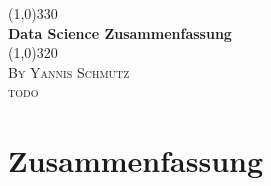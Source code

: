 \documentclass{article}
\begin{document}
\begin{titlepage}
	
	\begin{center}
	\line(1,0){330} \\
	[2mm]
	\huge{\bfseries Data Science Zusammenfassung} \\
	[2mm]
	\line(1,0){320} \\
	[1,5cm]
	\textsc{\LARGE By Yannis Schmutz} \\
	[0.75cm]
	\textsc{\large todo} \\
	
	\end{center}
	
\end{titlepage}

\section*{Zusammenfassung}	%
\cleardoublepage	%

\renewcommand{\contentsname}{Inhaltsverzeichnis}	%
\tableofcontents		%
\thispagestyle{empty}	%
\cleardoublepage	%

\listoffigures	%
\cleardoublepage

\listoftables
{}
\cleardoublepage
\end{document}
